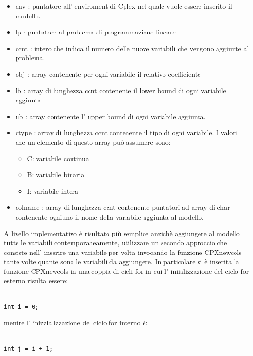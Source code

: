 \documentclass[11pt]{article}
\begin{document}
\begin{itemize}
\item env : puntatore all' enviroment di Cplex nel quale vuole essere inserito il modello.
\item lp : puntatore al problema di programmazione lineare.
\item ccnt : intero che indica il numero delle nuove variabili che vengono aggiunte al problema.
\item obj : array contenente per ogni variabile il relativo coefficiente 
\item lb : array di lunghezza ccnt contenente il lower bound di ogni variabile aggiunta.
\item ub : array contenente l' upper bound di ogni variabile aggiunta.
\item ctype : array di lunghezza ccnt contenente il tipo di ogni variabile. I valori che un elemento di questo array pu\`o assumere sono:
\begin{itemize}
	\item {}C: variabile continua
	\item {}B: variabile binaria
	\item {}I: variabile intera
\end{itemize}
\item colname : array di lunghezza ccnt contenente puntatori ad array di char contenente ogniuno il nome della variabile aggiunta al modello.
\end{itemize}

A livello implementativo \`e risultato pi\`u semplice anzich\`e  aggiungere al modello tutte le variabili contemporaneamente, utilizzare un secondo approccio che consiste nell' inserire una variabile per volta invocando la funzione CPXnewcols tante volte quante sono le variabili da aggiungere. In particolare si \`e inserita la funzione CPXnewcols in una coppia di cicli for in cui l' iniializzazione del ciclo for esterno risulta essere:

\begin{lstlisting}

int i = 0;

\end{lstlisting}

mentre l' inizzializzazione del ciclo for interno \`e:


\begin{lstlisting}

int j = i + 1;
\end{lstlisting}
\end{document}
